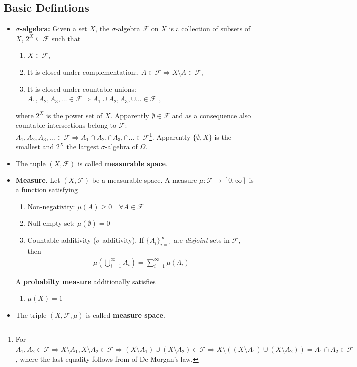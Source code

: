 \documentclass[10pt,a4paper]{article}
\begin{document}
\subsection{Basic Defintions}
\begin{itemize}
\item \textbf{$\sigma$-algebra:} Given a set $X$, the $\sigma$-algebra $\mathcal F$ on $X$ is a collection of subsets of $X$, $2^X \subseteq \mathcal F$  such that 
	\begin{enumerate}
		\item $X\in \mathcal F$,
		\item It is closed under complementation:, $A \in \mathcal F \Rightarrow X \setminus A \in \mathcal F $,  
		\item It is closed under countable unions: $A_1,  A_2, A_3, \dots \in \mathcal F \Rightarrow A_1 \cup A_2, A_3,  \cup ...  \in \mathcal F $ , 
	\end{enumerate}
where $2^X$ is the power set of $X$. Apparently $\emptyset \in \mathcal{F}$ and  as a consequence also countable intersections belong to $\mathcal F$: $A_1,  A_2, A_3, \dots \in \mathcal F \Rightarrow A_1 \cap  A_2, \cap A_3, \cap...  \in \mathcal F$\footnote{For $A_1, A_2 \in \mathcal F \Rightarrow X \setminus A_1, X  \setminus A_2 \in \mathcal F   \Rightarrow (X \setminus A_1) \cup  (X \setminus A_2) \in \mathcal F \Rightarrow X \setminus ((X \setminus A_1) \cup  (X \setminus A_2)) = A_1 \cap A_2 \in \mathcal F$, where the last equality follows from of De Morgan's law.}.  Apparently $\{\emptyset, X\}$ is the smallest and $2^X$  the largest  $\sigma$-algebra of $\Omega$. 
\item The tuple $(X, \mathcal F)$ is called \textbf{measurable space}.
\item \textbf{Measure}. Let  $(X, \mathcal F)$  be a measurable space. A measure $\mu: \mathcal F \rightarrow [0, \infty]$ is a function satisfying
	\begin{enumerate}
		\item Non-negativity: $\mu(A) \geq 0 \quad \forall  A \in \mathcal F$
		\item Null empty set: $\mu(\emptyset) = 0 $
		\item Countable additivity ($\sigma$-additivity). If $\{A_i\}_{i=1}^\infty$ are \textit{disjoint} sets in $\mathcal F$, then 
		\begin{align} \nonumber
		\mu\!\left(\bigcup\limits_{i=1}^\infty A_i \right) = \sum_{i=1}^\infty \mu(A_i)
		\end{align}
	\end{enumerate}
A \textbf{probabilty measure} additionally satisfies
\begin{enumerate}[start=4]
	\item $\mu(X) = 1$
\end{enumerate}
\item The triple  $(X, \mathcal F, \mu)$ is called \textbf{measure space}.

\end{itemize}
\end{document}
